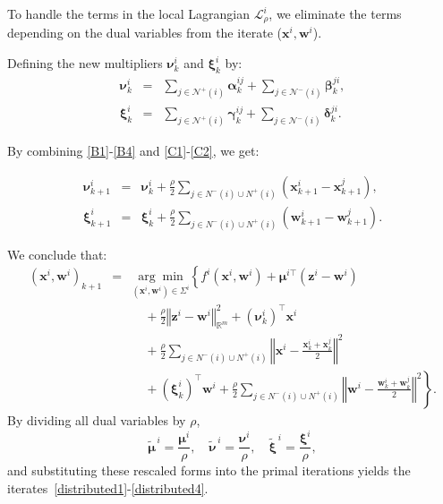\documentclass[11pt,a4paper]{article}
\theoremstyle{plain}
\theoremstyle{definition}
\theoremstyle{remark}
\begin{document}
	To handle the terms in the local Lagrangian $\mathcal{L}_{\rho}^i $, we
	eliminate the terms depending on the dual variables from the iterate ($%
	\boldsymbol{x}^i, \boldsymbol{w}^i $).
	
	Defining the new multipliers $\boldsymbol{\nu}_k^i$ and $\boldsymbol{\xi}_k^i $
	by:
	\begin{subequations}
		\begin{eqnarray}
			\boldsymbol{\nu}_k^i &=& \sum_{j \in \mathcal{N}^+(i)} \boldsymbol{\alpha}_k^{ij} 
			+ \sum_{j \in \mathcal{N}^-(i)} \boldsymbol{\beta}_k^{ji},\label{C1} \\
			\boldsymbol{\xi}_k^i &=& \sum_{j \in \mathcal{N}^+(i)} \boldsymbol{\gamma}_k^{ij} 
			+ \sum_{j \in \mathcal{N}^-(i)} \boldsymbol{\delta}_k^{ji}.\label{C2}
		\end{eqnarray}
	\end{subequations}
	
	By combining \eqref{B1}-\eqref{B4} and \eqref{C1}-\eqref{C2}, we get:
	
	\begin{eqnarray*}
		\boldsymbol{\nu}_{k+1}^i &=& \boldsymbol{\nu}_k^i + \frac{\rho}{2} \sum_{j
			\in N^-(i) \cup N^+(i)} \left( \boldsymbol{x}_{k+1}^i - \boldsymbol{x}%
		_{k+1}^j \right), \\
		\boldsymbol{\xi}_{k+1}^i &=& \boldsymbol{\xi}_k^i + \frac{\rho}{2} \sum_{j
			\in N^-(i) \cup N^+(i)} \left( \boldsymbol{w}_{k+1}^i - \boldsymbol{w}%
		_{k+1}^j \right).
	\end{eqnarray*}
	
	We conclude that:
	\begin{eqnarray}
		(\boldsymbol{x}^i, \boldsymbol{w}^i)_{k+1} &=& \underset{(\boldsymbol{x}^i, \boldsymbol{w}^i) \in \Sigma^i}{\arg \min} \left\{ f^i(\boldsymbol{x}^i, \boldsymbol{w}^i) + \boldsymbol{\mu}^{i\top} (\boldsymbol{z}^i - \boldsymbol{w}^i) \right. \nonumber \\
		&& \quad + \frac{\rho}{2} \left\Vert \boldsymbol{z}^i - \boldsymbol{w}^i \right\Vert_{\mathbb{R}^m}^2 + (\boldsymbol{\nu}_k^i)^{\top} \boldsymbol{x}^i \nonumber \\
		&& \quad + \frac{\rho}{2} \sum_{j \in N^-(i) \cup N^+(i)} \left\Vert \boldsymbol{x}^i - \frac{\boldsymbol{x}_k^i + \boldsymbol{x}_k^j}{2} \right\Vert^2 \nonumber \\
		&& \quad + (\boldsymbol{\xi}_k^i)^{\top} \boldsymbol{w}^i + \frac{\rho}{2} \sum_{j \in N^-(i) \cup N^+(i)} \left\Vert \boldsymbol{w}^i - \frac{\boldsymbol{w}_k^i + \boldsymbol{w}_k^j}{2} \right\Vert^2 \left. \right\}.
	\end{eqnarray}By dividing all dual variables by $\rho$,
	$$
	\tilde{\boldsymbol{\mu}}^{\,i} = \frac{\boldsymbol{\mu}^i}{\rho}, \quad 
	\tilde{\boldsymbol{\nu}}^{\,i} = \frac{\boldsymbol{\nu}^i}{\rho}, \quad 
	\tilde{\boldsymbol{\xi}}^{\,i} = \frac{\boldsymbol{\xi}^i}{\rho},
	$$
	and substituting these rescaled forms into the primal iterations yields the iterates~\eqref{distributed1}-\eqref{distributed4}.
	
	
	
	
	
	
	
	
	
	
	
\end{document}

